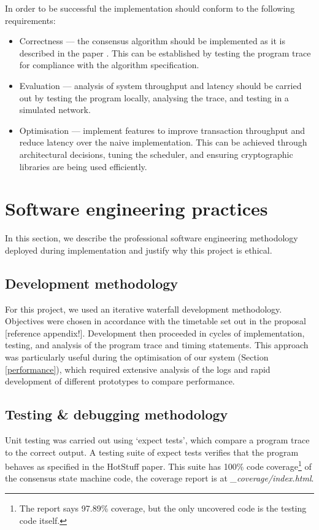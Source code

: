 In order to be successful the implementation should conform to the following requirements:
\begin{itemize}
	\item Correctness --- the consensus algorithm should be implemented as it is described in the paper \cite{yinHotStuffBFTConsensus2019}. This can be established by testing the program trace for compliance with the algorithm specification.
	\item Evaluation --- analysis of system throughput and latency should be carried out by testing the program locally, analysing the trace, and testing in a simulated network.
	\item Optimisation --- implement features to improve transaction throughput and reduce latency over the naive implementation. This can be achieved through architectural decisions, tuning the scheduler, and ensuring cryptographic libraries are being used efficiently.
\end{itemize}

\section{Software engineering practices} \label{softwareeng}

In this section, we describe the professional software engineering methodology deployed during implementation and justify why this project is ethical.

\subsection{Development methodology} \label{devmethods}

For this project, we used an iterative waterfall development methodology. Objectives were chosen in accordance with the timetable set out in the proposal [reference appendix!]. Development then proceeded in cycles of implementation, testing, and analysis of the program trace and timing statements. This approach was particularly useful during the optimisation of our system (Section \ref{performance}), which required extensive analysis of the logs and rapid development of different prototypes to compare performance.

\subsection{Testing \& debugging methodology} \label{testing}

Unit testing was carried out using `expect tests', which compare a program trace to the correct output. A testing suite of expect tests verifies that the program behaves as specified in the HotStuff paper. This suite has 100\% code coverage\footnote{The report says 97.89\% coverage, but the only uncovered code is the testing code itself.} of the consensus state machine code, the coverage report is at \textit{\_coverage/index.html}.

